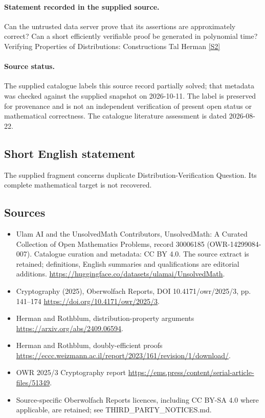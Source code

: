 \documentclass[11pt]{article}
\newcommand{\sref}[2]{\hyperlink{source:#1:#2}{[S#2]}}
\begin{document}
\paragraph{Statement recorded in the supplied source.}
Can the untrusted data server prove that its assertions are approximately correct? Can a short efficiently verifiable proof be generated in polynomial time? Verifying Properties of Distributions: Constructions Tal Herman \sref{30006185}{2}
\paragraph{Source status.}
The supplied catalogue labels this source record partially solved; that metadata was checked against the supplied snapshot on 2026-10-11. The label is preserved for provenance and is not an independent verification of present open status or mathematical correctness. The catalogue literature assessment is dated 2026-08-22.
\subsection{Short English statement}
The supplied fragment concerns duplicate Distribution-Verification Question. Its complete mathematical target is not recovered.
\subsection{Sources}
\begin{itemize}
\item[\hypertarget{source:30006185:1}{S1}] Ulam AI and the UnsolvedMath Contributors, UnsolvedMath: A Curated Collection of Open Mathematics Problems, record 30006185 (OWR-14299084-007). Catalogue curation and metadata: CC BY 4.0. The source extract is retained; definitions, English summaries and qualifications are editorial additions.
\url{https://huggingface.co/datasets/ulamai/UnsolvedMath}.
\item[\hypertarget{source:30006185:2}{S2}] Cryptography (2025), Oberwolfach Reports, DOI 10.4171/owr/2025/3, pp. 141--174
\url{https://doi.org/10.4171/owr/2025/3}.
\item[\hypertarget{source:30006185:3}{S3}] Herman and Rothblum, distribution-property arguments
\url{https://arxiv.org/abs/2409.06594}.
\item[\hypertarget{source:30006185:4}{S4}] Herman and Rothblum, doubly-efficient proofs
\url{https://eccc.weizmann.ac.il/report/2023/161/revision/1/download/}.
\item[\hypertarget{source:30006185:5}{S5}] OWR 2025/3 Cryptography report
\url{https://ems.press/content/serial-article-files/51349}.
\item Source-specific Oberwolfach Reports licences, including CC BY-SA 4.0 where applicable, are retained; see THIRD\_PARTY\_NOTICES.md.
\end{itemize}
\end{document}
